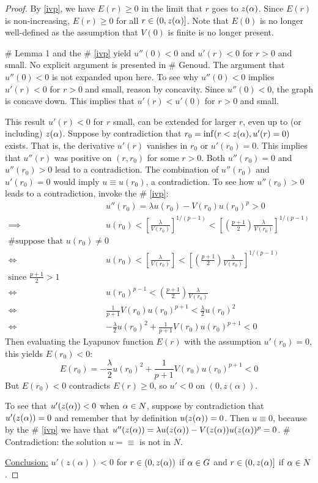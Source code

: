 \begin{proof}
By \cref{ivp}, we have $E(r)\geq0$ in the limit that $r$ goes to $z(\alpha)$. Since $E(r)$ is non-increasing, $E(r)\geq0$ for all $r\in(0,z(\alpha)]$. Note that $E(0)$ is no longer well-defined as the assumption that $V(0)$ is finite is no longer present.

\# Lemma 1 and the \# \cref{ivp} yield $u''(0)<0$ and $u'(r)<0$ for $r>0$ and small. No explicit argument is presented in \# Genoud. The argument that $u''(0)<0$ is not expanded upon here. To see why $u''(0)<0$ implies $u'(r)<0$ for $r>0$ and small, reason by concavity. Since $u''(0)<0$, the graph is concave down. This implies that $u'(r)<u'(0)$ for $r>0$ and small. 

This result $u'(r)<0$ for $r$ small, can be extended for larger $r$, even up to (or including) $z(\alpha)$. Suppose by contradiction that $r_0=\inf(r<z(\alpha),u'(r)=0)$ exists. That is, the derivative $u'(r)$ vanishes in $r_0$ or $u'(r_0)=0$. This implies that $u''(r)$ was positive on $(r,r_0)$ for some $r>0$. Both $u''(r_0)=0$ and $u''(r_0)>0$ lead to a contradiction. The combination of $u''(r_0)$ and $u'(r_0)=0$ would imply $u\equiv u(r_0)$, a contradiction. To see how $u''(r_0)>0$ leads to a contradiction, invoke the \# \cref{ivp}: 
\begin{align*}
&u''(r_0)=\lambda u(r_0)-V(r_0)u(r_0)^p>0\\
\implies &u(r_0)<\left[\frac{\lambda}{V(r_0)}\right]^{1/(p-1)}<\left[\left(\frac{p+1}{2}\right)\frac{\lambda}{V(r_0)}\right]^{1/(p-1)}\\
\text{\# suppose that }u(r_0)\neq0\\
\iff &u(r_0)<\left[\frac{\lambda}{V(r_0)}\right]<\left[\left(\frac{p+1}{2}\right)\frac{\lambda}{V(r_0)}\right]^{1/(p-1)}\\
\text{since }\frac{p+1}{2}>1\\
\iff &u(r_0)^{p-1}<\left(\frac{p+1}{2}\right)\frac{\lambda}{V(r_0)}\\
\iff &\frac{1}{p+1}V(r_0)u(r_0)^{p+1}<\frac{\lambda}{2}u(r_0)^2\\
\iff &-\frac{\lambda}{2}u(r_0)^2+\frac{1}{p+1}V(r_0)u(r_0)^{p+1}<0
\end{align*}
Then evaluating the Lyapunov function $E(r)$ with the assumption $u'(r_0)=0$, this yields $E(r_0)<0$:
$$ E(r_0)=-\frac{\lambda}{2}u(r_0)^2+\frac{1}{p+1}V(r_0)u(r_0)^{p+1}<0 $$
But $E(r_0)<0$ contradicts $E(r)\geq0$, so $u'<0$ on $(0,z(\alpha))$.

To see that $u'(z(\alpha))<0$ when $\alpha\in N$, suppose by contradiction that $u'(z(\alpha))=0$ and remember that by definition $u(z(\alpha))=0$. Then $u\equiv0$, because by the \# \cref{ivp} we have that $u''(z(\alpha))=\lambda u(z(\alpha))-V(z(\alpha))u(z(\alpha))^p=0$. \# Contradiction: the solution $u=\equiv$ is not in $N$.

\underline{Conclusion:} $u'(z(\alpha))<0$ for $r\in(0,z(\alpha))$ if $\alpha\in G$ and $r\in(0,z(\alpha)]$ if $\alpha\in N$.
\end{proof}



